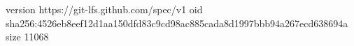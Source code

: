 version https://git-lfs.github.com/spec/v1
oid sha256:4526eb8eef12d1aa150dfd83c9cd98ac885cada8d1997bbb94a267ecd638694a
size 11068
